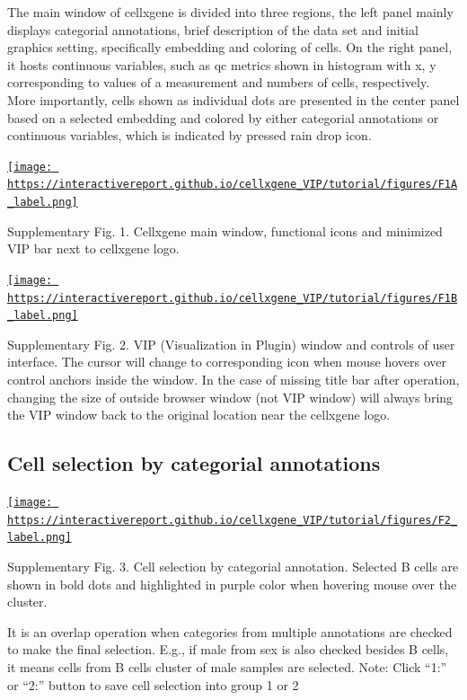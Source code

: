 \documentclass[
]{article}
\begin{document}
The main window of cellxgene is divided into three regions, the left panel mainly displays categorial
annotations, brief description of the data set and initial graphics setting, specifically embedding and
coloring of cells. On the right panel, it hosts continuous variables, such as qc metrics shown in histogram
with x, y corresponding to values of a measurement and numbers of cells, respectively. More
importantly, cells shown as individual dots are presented in the center panel based on a selected
embedding and colored by either categorial annotations or continuous variables, which is indicated by
pressed rain drop icon.

\href{https://interactivereport.github.io/cellxgene_VIP/tutorial/figures/F1A_label.png}{\texttt{[image: https://interactivereport.github.io/cellxgene\_VIP/tutorial/figures/F1A\_label.png]}}

Supplementary Fig. 1. Cellxgene main window, functional icons and minimized VIP bar next to cellxgene logo.

\href{https://interactivereport.github.io/cellxgene_VIP/tutorial/figures/F1B_label.png}{\texttt{[image: https://interactivereport.github.io/cellxgene\_VIP/tutorial/figures/F1B\_label.png]}}

Supplementary Fig. 2. VIP (Visualization in Plugin) window and controls of user interface. The cursor will change to corresponding icon when mouse hovers over control anchors inside the window. In the case of missing title bar after operation, changing the size of outside browser window (not VIP window) will always bring the VIP window back to the original location near the cellxgene logo.

\hypertarget{cell-selection-by-categorial-annotations}{%
\subsection{Cell selection by categorial annotations}\label{cell-selection-by-categorial-annotations}}

\href{https://interactivereport.github.io/cellxgene_VIP/tutorial/figures/F2_label.png}{\texttt{[image: https://interactivereport.github.io/cellxgene\_VIP/tutorial/figures/F2\_label.png]}}

Supplementary Fig. 3. Cell selection by categorial annotation. Selected B cells are shown in bold dots and highlighted in purple color when hovering mouse over the cluster.

It is an overlap operation when categories from multiple annotations are checked to make the final selection. E.g., if male from sex is also checked besides B cells, it means cells from B cells cluster of male samples are selected.
Note: Click ``1:'' or ``2:'' button to save cell selection into group 1 or 2
\end{document}
